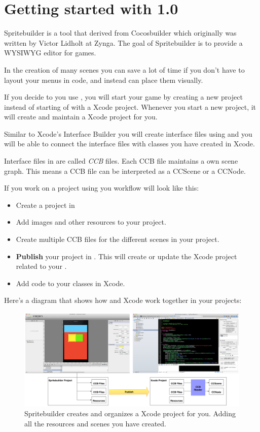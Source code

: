 \chapter{Getting started with \spriteb{} 1.0}
Spritebuilder is a tool that derived from Cocosbuilder which originally was
written by Victor Lidholt at Zynga. The goal of Spritebuilder is to provide a
WYSIWYG editor for \cocos{} games. 

In the creation of many scenes you can save a lot of time if you don't
have to layout your menus in code, and instead can place them visually.

If you decide to you use \spriteb{}, you will start your game by creating a new
\spriteb{} project instead of starting of with a Xcode project. Whenever you
start a new \spriteb{} project, it will create and maintain a Xcode project for
you.

Similar to Xcode's Interface Builder you will create interface files using
\spriteb{} and you will be able to connect the interface files with classes you
have created in Xcode.

Interface files in \spriteb{} are called \textit{CCB} files. Each 
CCB file maintains a own scene graph. This means a CCB file can be interpreted
as a CCScene or a CCNode.

If you work on a project using \spriteb{} you workflow will look like this:
\begin{itemize}
  \item Create a project in \spriteb{}
  \item Add images and other resources to your \spriteb{} project.
  \item Create multiple CCB files for the different scenes in your project.
  \item \textbf{Publish} your project in \spriteb{}. This will create or update
  the Xcode project related to your \spriteb{}. 
  \item Add code to your classes in Xcode.
\end{itemize}

Here's a diagram that shows how \spriteb{} and Xcode work together in your
\spriteb{} projects:

\begin{figure}[H]
		\centering
		\includegraphics[width=400pt]{images/spritebuilder_publishing.png}     
		\caption{Spritebuilder creates and organizes a Xcode project for you. Adding
		all the resources and scenes you have created.}
\end{figure}

